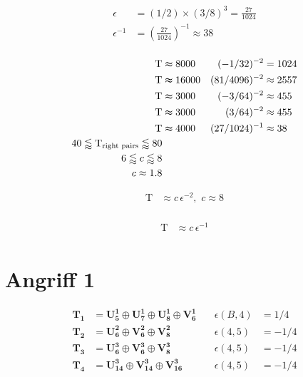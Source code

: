 \begin{equation*}
\begin{aligned}
    \epsilon &= (1/2)\times(3/8)^3 = \frac{27}{1024}\\
    \epsilon^{-1} &=  \left(\frac{27}{1024}\right)^{-1} \approx 38\\
\end{aligned}
\end{equation*}

\begin{equation*}
\begin{aligned}
    \text{T} &\thickapprox 8000 & (-1/32)^{-2} &= 1024\\
    \text{T} &\thickapprox 16000 & (81/4096)^{-2} &\approx 2557\\
    \text{T} &\thickapprox 3000 & (-3/64)^{-2} &\approx 455\\
    \text{T} &\thickapprox 3000 & (3/64)^{-2} &\approx 455\\
    \text{T} &\thickapprox 4000 & (27/1024)^{-1} &\approx 38\\
    40 \lessapprox \text{T}_{\text{right pairs}} \lessapprox 80\\
    6 \lessapprox c \lessapprox 8\\
    c \approx 1.8\\
\end{aligned}
\end{equation*}

\begin{equation*}
\begin{aligned}
    \text{T} &\approx c \,\epsilon^{-2}, \,\,c\approx8\\
\end{aligned}
\end{equation*}

\begin{equation*}
\begin{aligned}
    \text{T} &\approx c \,\epsilon^{-1}\\
\end{aligned}
\end{equation*}

\section*{Angriff 1}

\begin{equation*}
\begin{aligned}
    \mathbf{T_1} &= \mathbf{U^1_5} \oplus{} \mathbf{U^1_7} \oplus{} \mathbf{U^1_8} \oplus{} \mathbf{V^1_6} \quad  & \epsilon(B,4) &= 1/4 \\
    \mathbf{T_2} &= \mathbf{U^2_6} \oplus{} \mathbf{V^2_6} \oplus{} \mathbf{V^2_8}                          & \epsilon(4,5) &= -1/4 \\
    \mathbf{T_3} &= \mathbf{U^3_6} \oplus{} \mathbf{V^3_6} \oplus{} \mathbf{V^3_8}                          & \epsilon(4,5) &= -1/4 \\
    \mathbf{T_4} &= \mathbf{U^3_{14}} \oplus{} \mathbf{V^3_{14}} \oplus{} \mathbf{V^3_{16}}                 & \epsilon(4,5) &= -1/4 \\
\end{aligned}
\end{equation*}

